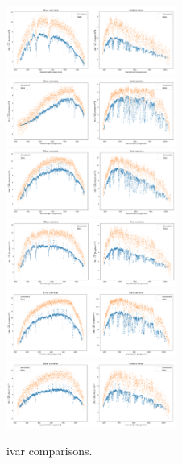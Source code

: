 \begin{figure}[h]
    \centering
    \includegraphics[width=0.495\textwidth]{images/specsim/ivar_4055_55359_334.png}
    \includegraphics[width=0.495\textwidth]{images/specsim/ivar_4055_55359_395.png}
    \includegraphics[width=0.495\textwidth]{images/specsim/ivar_4055_55359_41.png}
     \includegraphics[width=0.495\textwidth]{images/specsim/ivar_4055_55359_694.png}
      \includegraphics[width=0.495\textwidth]{images/specsim/ivar_4055_55359_890.png}
       \includegraphics[width=0.495\textwidth]{images/specsim/ivar_4055_55359_970.png}
    \caption{ivar comparisons.}
    \label{fig:ivar}
\end{figure}


